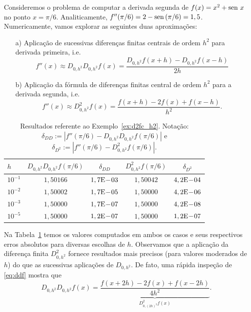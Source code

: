 \begin{ex}\label{ex:d2fc_h2}
  Consideremos o problema de computar a derivada segunda de $f(x) = x^2 + \operatorname{sen}\, x$ no ponto $x=\pi/6$. Analiticamente, $f''(\pi/6) = 2 - \operatorname{sen}\,(\pi/6) = 1,5$. Numericamente, vamos explorar as seguintes duas aproximações:
  \begin{enumerate}
  \item[a)] Aplicação de sucessivas diferenças finitas centrais de ordem $h^2$ para derivada primeira, i.e.
    \begin{equation}\label{eq:ddf}
      f''(x) \approx D_{0,h^2}D_{0,h^2}f(x) = \frac{D_{0,h^2}f(x+h) - D_{0,h^2}f(x-h)}{2h}
    \end{equation}
  \item[b)] Aplicação da fórmula de diferenças finitas central de ordem $h^2$ para a derivada segunda, i.e.
    \begin{equation}
      f''(x) \approx D_{0,h^2}^2 f(x) = \frac{f(x+h) - 2f(x) + f(x-h)}{h^2}.
    \end{equation}
  \end{enumerate}

\begin{table}[h!]
  \centering
  \caption{Resultados referente ao Exemplo~\ref{ex:d2fc_h2}. Notação: $\delta_{DD}:=|f''(\pi/6)-D_{0,h^2}D_{0,h^2}f(\pi/6)|$ e $\delta_{D^2}:=|f''(\pi/6)-D^2_{0,h^2}f(\pi/6)|$.}
  \begin{tabular}{l|cc|cc}
    $h$ & $D_{0,h^2}D_{0,h^2}f(\pi/6)$ & $\delta_{DD}$ & $D^2_{0,h^2}f(\pi/6)$ & $\delta_{D^2}$ \\ \hline
    $10^{-1}$ &  $1,50166$ & $1,7\mathrm{E}\!-\!03$ & $1,50042$ & $4,2\mathrm{E}\!-\!04$ \\
    $10^{-2}$ &  $1,50002$ & $1,7\mathrm{E}\!-\!05$ & $1,50000$ & $4,2\mathrm{E}\!-\!06$ \\
    $10^{-3}$ &  $1,50000$ & $1,7\mathrm{E}\!-\!07$ & $1,50000$ & $4,2\mathrm{E}\!-\!08$ \\
    $10^{-5}$ &  $1,50000$ & $1,2\mathrm{E}\!-\!07$ & $1,50000$ & $1,2\mathrm{E}\!-\!07$ \\\hline
  \end{tabular}
  \label{tab:ex_d2fc_h2}
\end{table}

Na Tabela~\ref{tab:ex_d2fc_h2} temos os valores computados em ambos os casos e seus respectivos erros absolutos para diversas escolhas de $h$. Observamos que a aplicação da diferença finita $D^2_{0,h^2}$ fornece resultados mais precisos (para valores moderados de $h$) do que as sucessivas aplicações de $D_{0,h^2}$. De fato, uma rápida inspeção de \eqref{eq:ddf} mostra que
\begin{equation}
  D_{0,h^2}D_{0,h^2}f(x) = \underbrace{\frac{f(x+2h) - 2f(x) + f(x-2h)}{4h^2}}_{D^2_{0,(2h)^2}f(x)}.
\end{equation}


\end{ex}
